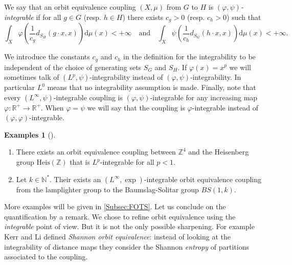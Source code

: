\documentclass[english, 11pt, a4paper]{article}
\newcommand{\deffont}[1]{\emph{#1}}
\theoremstyle{definition}
\newtheorem{Exs}[Def]{Examples}
\numberwithin{equation}{section}
\newcommand{\bN}{\mathbb{N}}
\newcommand{\bZ}{\mathbb{Z}}
\newcommand{\bR}{\mathbb{R}}
\begin{document}
\begin{Def}\label{Def:QuantMev}
  We say that an orbit equivalence coupling
  $(X,\mu)$ from $G$ to $H$ is \deffont{$(\varphi,\psi)$-integrable} if
  for all $g\in G$ (resp. $h\in H$) there exists $c_g>0$ (resp. $c_h>0$) such
  that
  \begin{equation*}
    \int_{X} \varphi\left( \frac{1}{c_g} d_{S_H}(g\cdot x, x)
    \right)\mathrm{d}\mu(x)<+\infty \quad \text{and} \quad
    \int_{X}\psi\left( \frac{1}{c_h} d_{S_G}(h\cdot x, x)\right)
    \mathrm{d}\mu(x)<+\infty.
  \end{equation*} 
\end{Def}
We introduce the constants $c_g$ and $c_h$ in the definition for the 
integrability to be independent of the choice of generating sets $S_G$ and
$S_H$. If $\varphi(x)=x^p$ we will sometimes talk of $(L^p,\psi)$-integrability
instead of $(\varphi,\psi)$-integrability. In particular $L^0$ means
that no integrability assumption is made.
Finally, note that every $(L^\infty,\psi)$-integrable coupling is
$(\varphi,\psi)$-integrable for any increasing map $\varphi: \bR^+\rightarrow
\bR^+$.  When $\varphi=\psi$ we will say that the coupling is
$\varphi$-integrable instead of $(\varphi, \varphi)$-integrable.  

\begin{Exs}[\cite{DKLMT}]\label{Ex:CouplagesQt}\leavevmode 
  \begin{enumerate}
  \item There exists an orbit
    equivalence coupling between $\bZ^4$ and the Heisenberg 
    group $\mathrm{Heis}(\bZ)$ that is $L^p$-integrable for all $p<1$. 
  \item Let $k\in \bN^{*}$. Their exists an $(L^{\infty},\exp)$-integrable orbit
    equivalence coupling from the lamplighter group to the Baumslag-Solitar
    group $BS(1,k)$.
  \end{enumerate}
\end{Exs}

More examples will be given in \cref{Subsec:FOTS}. Let us conclude on the
quantification by a remark. We chose to refine orbit
equivalence using the \emph{integrable} point of view. But it is not the only
possible sharpening. For example Kerr and Li \cite{KerrLi} defined
\emph{Shannon orbit equivalence}: instead of looking at the integrability of
distance maps they consider the Shannon \emph{entropy} of partitions associated
to the coupling.
\end{document}
